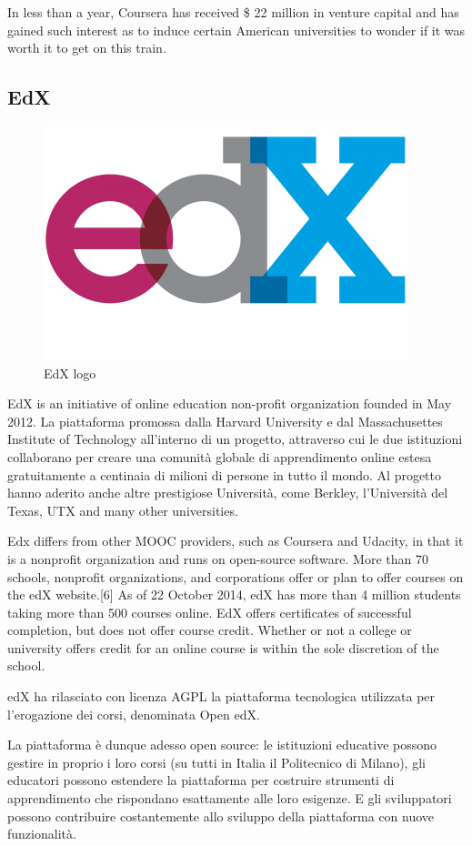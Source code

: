 In less than a year, Coursera has received \$ 22 million in venture capital and has gained such interest as to induce certain American universities to wonder if it was worth it to get on this train.

\subsection{EdX}
\label{subsec:EdX}
\begin{figure}[htb] %
 \centering
 \includegraphics[width=0.5\linewidth]{images/chapter1/edx_logo.png}\hfill
 \caption[EdX logo]{EdX logo}
 \label{fig:fourV}
\end{figure}

EdX is an initiative of online education non-profit organization founded in May 2012.
La piattaforma promossa dalla Harvard University e dal Massachusettes Institute of Technology all’interno di un progetto, attraverso cui le due istituzioni collaborano per creare una comunità globale di apprendimento online estesa gratuitamente a centinaia di milioni di persone in tutto il mondo. Al progetto hanno aderito anche altre prestigiose Università, come Berkley, l’Università del Texas, UTX and many other universities.

Edx differs from other MOOC providers, such as Coursera and Udacity, in that it is a nonprofit organization and runs on open-source software.\cite{mooc_edx}
More than 70 schools, nonprofit organizations, and corporations offer or plan to offer courses on the edX website.[6] 
As of 22 October 2014, edX has more than 4 million students taking more than 500 courses online.\cite{mooc_edx}
EdX offers certificates of successful completion, but does not offer course credit. Whether or not a college or university offers credit for an online course is within the sole discretion of the school.\cite{mooc_edx}


edX ha rilasciato con licenza AGPL la piattaforma tecnologica utilizzata per l’erogazione dei corsi, denominata Open edX.

La piattaforma è dunque adesso open source: le istituzioni educative possono gestire in proprio i loro corsi (su tutti in Italia il Politecnico di Milano), gli educatori possono estendere la piattaforma per costruire strumenti di apprendimento che rispondano esattamente alle loro esigenze. E gli sviluppatori possono contribuire costantemente allo sviluppo della piattaforma con nuove funzionalità.


